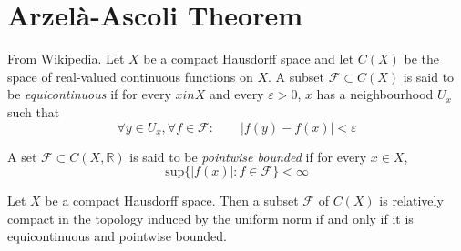 \section{Arzelà-Ascoli Theorem}
\label{section-Arzela-Ascoli-theorem}
\begin{definition}
\label{definition-equicontinuous}
From Wikipedia. Let $X$ be a compact
Hausdorff space and let  $C(X)$ be the
space of real-valued continuous functions on
$X$. A subset $\mathcal{F} \subset
C(X)$ is said to be {\it equicontinuous} if
for every $x in X$ and every
$\varepsilon>0$, $x$ has a neighbourhood
$U_x$ such that
$$
\forall y \in U_x, \forall f \in \mathcal{F}:
\qquad |f(y)-f(x)|<\varepsilon
$$
\end{definition}

\begin{definition}
\label{definition-pointwise-bounded}
A set $\mathcal{F}\subset C(X,\mathbb{R})$ is
said to be {\it pointwise
bounded} if for every $x \in X$,
$$
\text{sup}\{|f(x)|:f \in \mathcal{F}\}<\infty
$$
\end{definition}

\begin{theorem}
\label{theorem-Arzela-Ascoli}
Let $X$ be a compact Hausdorff space. Then a
subset $\mathcal{F}$ of $C(X)$ is
relatively compact in the topology induced by
the uniform norm if and only if it
is equicontinuous and pointwise bounded.
\end{theorem}





